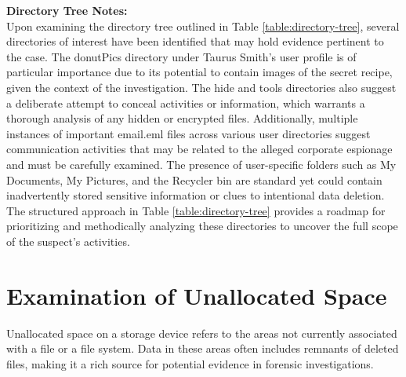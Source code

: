 \textbf{Directory Tree Notes:}\\
Upon examining the directory tree outlined in Table \ref{table:directory-tree}, several directories of interest have been identified that may hold evidence pertinent to the case. The donutPics directory under Taurus Smith's user profile is of particular importance due to its potential to contain images of the secret recipe, given the context of the investigation. The hide and tools directories also suggest a deliberate attempt to conceal activities or information, which warrants a thorough analysis of any hidden or encrypted files. Additionally, multiple instances of important email.eml files across various user directories suggest communication activities that may be related to the alleged corporate espionage and must be carefully examined. The presence of user-specific folders such as My Documents, My Pictures, and the Recycler bin are standard yet could contain inadvertently stored sensitive information or clues to intentional data deletion. The structured approach in Table \ref{table:directory-tree} provides a roadmap for prioritizing and methodically analyzing these directories to uncover the full scope of the suspect's activities.

\section{Examination of Unallocated Space}
Unallocated space on a storage device refers to the areas not currently associated with a file or a file system. Data in these areas often includes remnants of deleted files, making it a rich source for potential evidence in forensic investigations.

